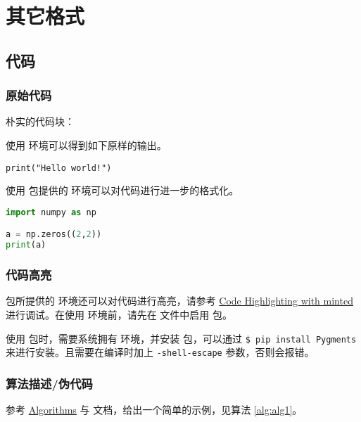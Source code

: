 
\chapter{其它格式}
\section{代码}
\subsection{原始代码}
朴实的代码块：

使用  环境可以得到如下原样的输出。
\begin{verbatim}
print("Hello world!")
\end{verbatim}

使用  包提供的  环境可以对代码进行进一步的格式化。
\begin{lstlisting}[language=Python,frame=single]
import numpy as np

a = np.zeros((2,2))
print(a)
\end{lstlisting}

\subsection{代码高亮}
 包所提供的  环境还可以对代码进行高亮，请参考 \href{https://www.overleaf.com/learn/latex/Code_Highlighting_with_minted}{Code Highlighting with minted} 进行调试。在使用  环境前，请先在  文件中启用  包。

\begin{notice}
  使用  包时，需要系统拥有  环境，并安装  包，可以通过 \verb|$ pip install Pygments| 来进行安装。且需要在编译时加上 \verb|-shell-escape| 参数，否则会报错。
\end{notice}



\subsection{算法描述/伪代码}
参考 \href{https://en.wikibooks.org/wiki/LaTeX/Algorithms}{Algorithms} 与  文档，给出一个简单的示例，见算法 \ref{alg:alg1}。

